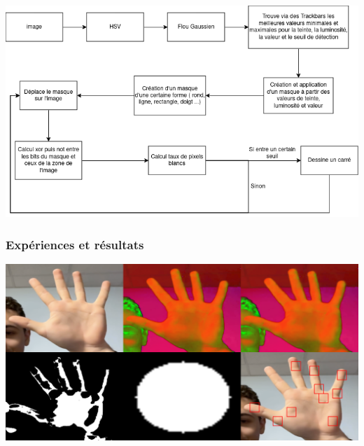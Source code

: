 \documentclass[11pt]{article}
\begin{document}
\begin{center}
    \includegraphics[width=\textwidth]{images/pipeline_detect_fingers_sans_convex_hull.png}
    \label{fig:pipeline_detect_fingers_sans_convex_hull}
\end{center}

\subsubsection{Expériences et résultats}
\begin{center}
    \includegraphics[width=\textwidth]{images/detect_fingers_mask_4.png}
    \label{fig:detect_fingers_mask_4}
\end{center}
\end{document}
